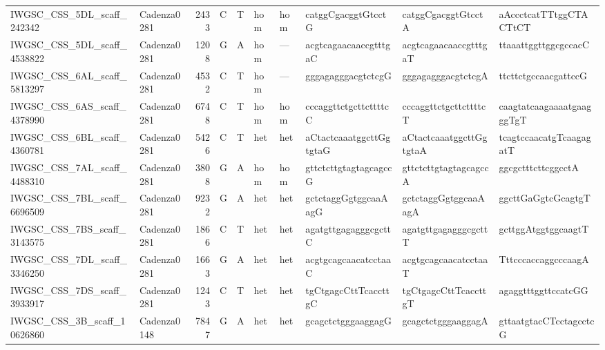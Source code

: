 \begin{tabular}{llrlllllll}
 IWGSC\_CSS\_5DL\_scaff\_242342   & Cadenza0281 &       2433 & C         & T        & hom            & hom         & catggCgacggtGtcctG        & catggCgacggtGtcctA        & aAccctcatTTtggCTACTtCT    \\
 IWGSC\_CSS\_5DL\_scaff\_4538822  & Cadenza0281 &       1208 & G         & A        & hom            & ---         & acgtcagaacaaccgtttgaC     & acgtcagaacaaccgtttgaT     & ttaaattggttggcgccacC      \\
 IWGSC\_CSS\_6AL\_scaff\_5813297  & Cadenza0281 &       4532 & C         & T        & hom            & ---         & gggagagggacgtctcgG        & gggagagggacgtctcgA        & ttcttctgccaacgattccG      \\
 IWGSC\_CSS\_6AS\_scaff\_4378990  & Cadenza0281 &       6748 & C         & T        & hom            & hom         & cccaggttctgcttcttttcC     & cccaggttctgcttcttttcT     & caagtatcaagaaaatgaagggTgT \\
 IWGSC\_CSS\_6BL\_scaff\_4360781  & Cadenza0281 &       5426 & C         & T        & het            & het         & aCtactcaaatggcttGgtgtaG   & aCtactcaaatggcttGgtgtaA   & tcagtccaacatgTcaagagatT   \\
 IWGSC\_CSS\_7AL\_scaff\_4488310  & Cadenza0281 &       3808 & G         & A        & hom            & hom         & gttctcttgtagtagcagccG     & gttctcttgtagtagcagccA     & ggcgctttcttcggcctA        \\
 IWGSC\_CSS\_7BL\_scaff\_6696509  & Cadenza0281 &       9232 & G         & A        & het            & het         & gctctaggGgtggcaaAagG      & gctctaggGgtggcaaAagA      & ggcttGaGgtcGcagtgT        \\
 IWGSC\_CSS\_7BS\_scaff\_3143575  & Cadenza0281 &       1866 & C         & T        & het            & het         & agatgttgagagggcgcttC      & agatgttgagagggcgcttT      & gcttggAtggtggcaagtT       \\
 IWGSC\_CSS\_7DL\_scaff\_3346250  & Cadenza0281 &       1663 & G         & A        & het            & het         & acgtgcagcaacatcctaaC      & acgtgcagcaacatcctaaT      & TttcccaccaggcccaagA       \\
 IWGSC\_CSS\_7DS\_scaff\_3933917  & Cadenza0281 &       1243 & C         & T        & het            & het         & tgCtgagcCttTcaccttgC      & tgCtgagcCttTcaccttgT      & agaggtttggttccatcGG       \\
 IWGSC\_CSS\_3B\_scaff\_10626860  & Cadenza0148 &       7847 & G         & A        & het            & het         & gcagctctgggaaggagG        & gcagctctgggaaggagA        & gttaatgtacCTcctagcctcG    \\

\end{tabular}
